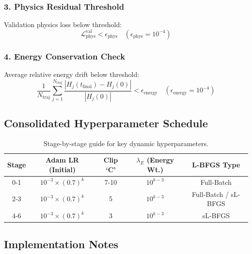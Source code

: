 \documentclass{article}
\begin{document}
\subsubsection{3. Physics Residual Threshold}
Validation physics loss below threshold:
\begin{equation}
\mathcal{L}_{\text{phys}}^{\text{val}} < \epsilon_{\text{phys}} \quad (\epsilon_{\text{phys}} = 10^{-4})
\end{equation}

\subsubsection{4. Energy Conservation Check}
Average relative energy drift below threshold:
\begin{equation}
\frac{1}{N_{\text{traj}}} \sum_{j=1}^{N_{\text{traj}}} \frac{|H_j(t_{\text{final}}) - H_j(0)|}{|H_j(0)|} < \epsilon_{\text{energy}} \quad (\epsilon_{\text{energy}} = 10^{-4})
\end{equation}

\subsection{Consolidated Hyperparameter Schedule}

\begin{table}[h!]
\centering
\begin{tabular}{|c|c|c|c|c|}
\hline
\textbf{Stage} & \textbf{Adam LR (Initial)} & \textbf{Clip `C'} & \textbf{$\lambda_E$ (Energy Wt.)} & \textbf{L-BFGS Type} \\
\hline
0-1 & $10^{-3} \times (0.7)^k$ & 7-10 & $10^{k-3}$ & Full-Batch \\
2-3 & $10^{-3} \times (0.7)^k$ & 5 & $10^{k-3}$ & Full-Batch / sL-BFGS \\
4-6 & $10^{-3} \times (0.7)^k$ & 3 & $10^{k-3}$ & sL-BFGS \\
\hline
\end{tabular}
\caption{Stage-by-stage guide for key dynamic hyperparameters.}
\end{table}

\subsection{Implementation Notes}
\end{document}
